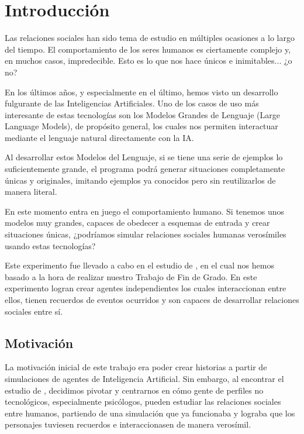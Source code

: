 \chapter{Introducción}
\label{cap:introduccion}


Las relaciones sociales han sido tema de estudio en múltiples ocasiones a lo largo del tiempo. El comportamiento de los seres humanos es ciertamente complejo y, en muchos casos, impredecible. Esto es lo que nos hace únicos e inimitables... ¿o no?

En los últimos años, y especialmente en el último, hemos visto un desarrollo fulgurante de las Inteligencias Artificiales. Uno de los casos de uso más interesante de estas tecnologías son los Modelos Grandes de Lenguaje (Large Language Models), de propósito general, los cuales nos permiten interactuar mediante el lenguaje natural directamente con la IA.

Al desarrollar estos Modelos del Lenguaje, si se tiene una serie de ejemplos lo suficientemente grande, el programa podrá generar situaciones completamente únicas y originales, imitando ejemplos ya conocidos pero sin reutilizarlos de manera literal.

En este momento entra en juego el comportamiento humano. Si tenemos unos modelos muy grandes, capaces de obedecer a esquemas de entrada y crear situaciones únicas, ¿podríamos simular relaciones sociales humanas verosímiles usando estas tecnologías?

Este experimento fue llevado a cabo en el estudio de \cite{park2023generative}, en el cual nos hemos basado a la hora de realizar nuestro Trabajo de Fin de Grado. En este experimento logran crear agentes independientes los cuales interaccionan entre ellos, tienen recuerdos de eventos ocurridos y son capaces de desarrollar relaciones sociales entre sí.

\section{Motivación}
La motivación inicial de este trabajo era poder crear historias a partir de simulaciones de agentes de Inteligencia Artificial. Sin embargo, al encontrar el estudio de \ga, decidimos pivotar y centrarnos en cómo gente de perfiles no tecnológicos, especialmente psicólogos, pueden estudiar las relaciones sociales entre humanos, partiendo de una simulación que ya funcionaba y lograba que los personajes tuviesen recuerdos e interaccionasen de manera verosímil.

